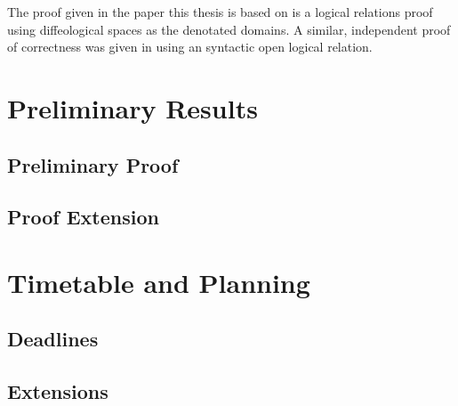 \documentclass[a4, 12pt, final]{article}
\begin{document}
The proof given in the paper this thesis is based on is a logical relations proof using diffeological spaces as the denotated domains\cite{huot2020correctness}. A similar, independent proof of correctness was given in \cite{barthe2020versatility} using an syntactic open logical relation.

\section{Preliminary Results}

\subsection{Preliminary Proof}

\subsection{Proof Extension}

\section{Timetable and Planning}

\subsection{Deadlines}

\subsection{Extensions}

\printbibliography
% 
\end{document}
